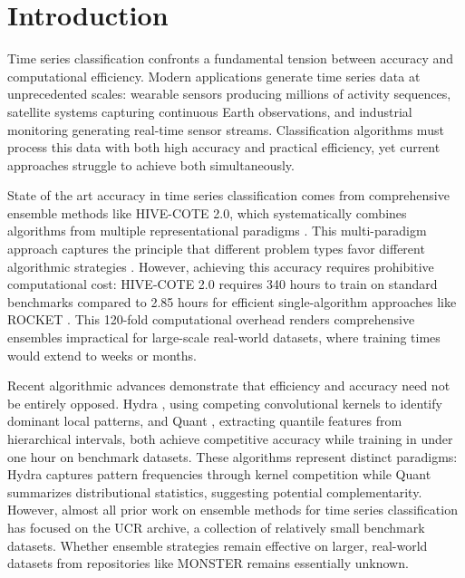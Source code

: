 \documentclass[pdflatex,sn-basic]{sn-jnl}           %
\theoremstyle{thmstyleone}%
\theoremstyle{thmstyletwo}%
\theoremstyle{thmstylethree}%
\begin{document}
\maketitle

\section{Introduction}\label{sec1}

Time series classification confronts a fundamental tension between accuracy and computational efficiency. Modern applications generate time series data at unprecedented scales: wearable sensors producing millions of activity sequences, satellite systems capturing continuous Earth observations, and industrial monitoring generating real-time sensor streams. Classification algorithms must process this data with both high accuracy and practical efficiency, yet current approaches struggle to achieve both simultaneously.

State of the art accuracy in time series classification comes from comprehensive ensemble methods like HIVE-COTE 2.0, which systematically combines algorithms from multiple representational paradigms \citep{hive-cote-2}. This multi-paradigm approach captures the principle that different problem types favor different algorithmic strategies \citep{tsc-bakeoff}. However, achieving this accuracy requires prohibitive computational cost: HIVE-COTE 2.0 requires 340 hours to train on standard benchmarks compared to 2.85 hours for efficient single-algorithm approaches like ROCKET \citep{hive-cote-2}. This 120-fold computational overhead renders comprehensive ensembles impractical for large-scale real-world datasets, where training times would extend to weeks or months.

Recent algorithmic advances demonstrate that efficiency and accuracy need not be entirely opposed. Hydra \citep{hydra}, using competing convolutional kernels to identify dominant local patterns, and Quant \citep{quant}, extracting quantile features from hierarchical intervals, both achieve competitive accuracy while training in under one hour on benchmark datasets. These algorithms represent distinct paradigms: Hydra captures pattern frequencies through kernel competition while Quant summarizes distributional statistics, suggesting potential complementarity. However, almost all prior work on ensemble methods for time series classification has focused on the UCR archive, a collection of relatively small benchmark datasets. Whether ensemble strategies remain effective on larger, real-world datasets from repositories like MONSTER \citep{monster} remains essentially unknown.
\end{document}

